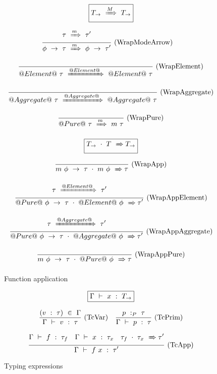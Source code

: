\begin{figure}

$$
\boxed{T_{\to} ~\xRightarrow{M}~ T_{\to}}
$$

$$
\frac {\displaystyle 
    \tau ~\xRightarrow{m}~ \tau'
} {\displaystyle 
    \phi~\to~\tau ~\xRightarrow{m}~ \phi~\to~\tau'
} \ 
\textrm{(WrapModeArrow)}
\quad
$$

$$
\frac {\displaystyle  } {\displaystyle 
    @Element@~\tau ~\xRightarrow{@Element@}~ @Element@~\tau
} \ 
\textrm{(WrapElement)}
$$

$$
\frac {\displaystyle  } {\displaystyle 
    @Aggregate@~\tau ~\xRightarrow{@Aggregate@}~ @Aggregate@~\tau
} \ 
\textrm{(WrapAggregate)}
$$

$$
\frac {\displaystyle  } {\displaystyle 
    @Pure@~\tau ~\xRightarrow{m}~ m~\tau
} \ 
\textrm{(WrapPure)}
$$


$$
\boxed{T_{\to}~\cdot~T ~\xRightarrow~ T_{\to}}
$$

$$
\frac {\displaystyle 
} {\displaystyle 
    m~\phi~\to~\tau~\cdot~m~\phi ~\xRightarrow~ \tau
} \ 
\textrm{(WrapApp)}
$$


$$
\frac {\displaystyle 
    \tau ~\xRightarrow{@Element@}~ \tau'
} {\displaystyle 
    @Pure@~\phi~\to~\tau~\cdot~@Element@~\phi ~\xRightarrow~ \tau'
} \ 
\textrm{(WrapAppElement)}
$$

$$
\frac {\displaystyle 
    \tau ~\xRightarrow{@Aggregate@}~ \tau'
} {\displaystyle 
    @Pure@~\phi~\to~\tau~\cdot~@Aggregate@~\phi ~\xRightarrow~ \tau'
} \ 
\textrm{(WrapAppAggregate)}
$$

$$
\frac {\displaystyle 
} {\displaystyle 
    m~\phi~\to~\tau~\cdot~@Pure@~\phi ~\xRightarrow~ \tau
} \ 
\textrm{(WrapAppPure)}
$$


\caption{Function application}
\label{fig:source:type:wrap}
\end{figure}

\begin{figure}

$$
\boxed{\Gamma ~\vdash~ x ~:~ T_\to}
$$


$$
\frac {\displaystyle 
    (v~:~\tau) ~\in~ \Gamma
} {\displaystyle  
    \Gamma ~\vdash~ v ~:~ \tau
} \ 
\textrm{(TcVar)}
\quad
\frac {\displaystyle 
    p ~:_{P}~ \tau
} {\displaystyle 
    \Gamma ~\vdash~ p ~:~ \tau
} \ 
\textrm{(TcPrim)}
$$

$$
\frac {\displaystyle 
    \Gamma ~\vdash~ f ~:~ \tau_f
    \quad
    \Gamma ~\vdash~ x ~:~ \tau_x
    \quad
    \tau_f~\cdot~\tau_x ~\xRightarrow~ \tau'
} {\displaystyle 
    \Gamma ~\vdash~ f~x ~:~ \tau'
} \ 
\textrm{(TcApp)}
$$


\caption{Typing expressions}
\label{fig:source:type:exp}
\end{figure}

